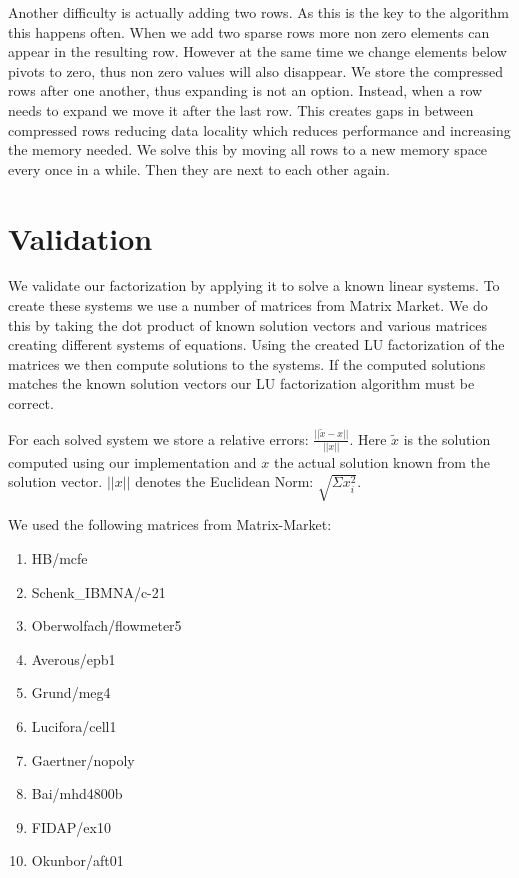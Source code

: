 \documentclass[10pt]{article}
\begin{document}
Another difficulty is actually adding two rows. As this is the key to the algorithm this happens often. When we add two sparse rows more non zero elements can appear in the resulting row. However at the same time we change elements below pivots to zero, thus non zero values will also disappear. We store the compressed rows after one another, thus expanding is not an option. Instead, when a row needs to expand we move it after the last row. This creates gaps in between compressed rows reducing data locality which reduces performance and increasing the memory needed. We solve this by moving all rows to a new memory space every once in a while. Then they are next to each other again.

\section{Validation}
\label{sec:val}
We validate our factorization by applying it to solve a known linear systems. To create these systems we use a number of matrices from Matrix Market. We do this by taking the dot product of known solution vectors and various matrices creating different systems of equations. Using the created LU factorization of the matrices we then compute solutions to the systems. If the computed solutions matches the known solution vectors our LU factorization algorithm must be correct. 

For each solved system we store a relative errors: $\frac{||\widetilde{x}-x||}{||x||}$. Here $\widetilde{x}$ is the solution computed using our implementation and $x$ the actual solution known from the solution vector. $||x||$ denotes the Euclidean Norm: $\sqrt{\Sigma x_i^2}$.

We used the following matrices from Matrix-Market:
\begin{multicols}{2}
\begin{enumerate}
    \item HB/mcfe
    \item Schenk\_IBMNA/c-21
    \item Oberwolfach/flowmeter5
    \item Averous/epb1
    \item Grund/meg4
    \item Lucifora/cell1
    \item Gaertner/nopoly
    \item Bai/mhd4800b
    \item FIDAP/ex10
    \item Okunbor/aft01
\end{enumerate}
\end{multicols}
\end{document}
